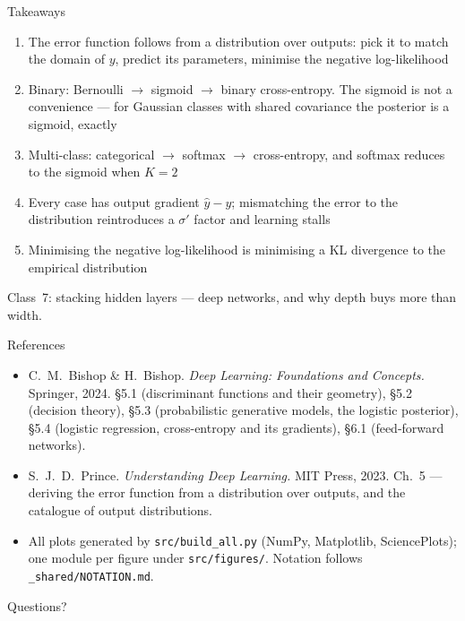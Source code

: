 \documentclass[aspectratio=169, 11pt]{beamer}
\newcommand{\nosrc}{}       %
\begin{document}
\begin{frame}{Takeaways}
  \nosrc
  \vspace{0.1em}
  {\footnotesize
  \begin{enumerate}\setlength{\itemsep}{2pt}
    \item The error function \alert{follows from a distribution
          over outputs}: pick it to match the domain of $y$,
          predict its parameters, minimise the negative
          log-likelihood
    \item Binary: Bernoulli $\to$ sigmoid $\to$ binary
          cross-entropy. The sigmoid is not a convenience --- for
          Gaussian classes with shared covariance the posterior
          \alert{is} a sigmoid, exactly
    \item Multi-class: categorical $\to$ softmax $\to$
          cross-entropy, and softmax reduces to the sigmoid when
          $K=2$
    \item Every case has output gradient \alert{$\hat y-y$};
          mismatching the error to the distribution reintroduces a
          $\sigma'$ factor and learning stalls
    \item Minimising the negative log-likelihood is minimising a
          \alert{KL divergence} to the empirical distribution
  \end{enumerate}}
  \vspace{0.2em}
  \begin{redhighlight}
    {\footnotesize Class~7: stacking hidden layers ---
    \alert{deep networks}, and why depth buys more than width.}
  \end{redhighlight}
\end{frame}

\begin{frame}{References}
  \nosrc
  \footnotesize
  \begin{itemize}\setlength{\itemsep}{3pt}
    \item C.~M.~Bishop \& H.~Bishop. \textit{Deep Learning:
          Foundations and Concepts.} Springer, 2024.
          \S5.1 (discriminant functions and their geometry),
          \S5.2 (decision theory), \S5.3 (probabilistic generative
          models, the logistic posterior), \S5.4 (logistic
          regression, cross-entropy and its gradients),
          \S6.1 (feed-forward networks).
    \item S.~J.~D.~Prince. \textit{Understanding Deep Learning.}
          MIT Press, 2023. Ch.~5 --- deriving the error function
          from a distribution over outputs, and the catalogue of
          output distributions.
    \item All plots generated by \texttt{src/build\_all.py}
          (NumPy, Matplotlib, SciencePlots); one module per figure
          under \texttt{src/figures/}. Notation follows
          \texttt{\_shared/NOTATION.md}.
  \end{itemize}
\end{frame}

\begin{frame}[standout]
  \nosrc
  Questions?
\end{frame}
\end{document}

